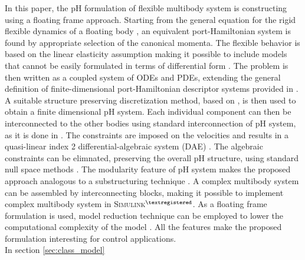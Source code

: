 \documentclass{svjour3}                     %
\begin{document}
In this paper, the pH formulation of flexible multibody system is constructing using a floating frame approach. Starting from the general equation for the rigid flexible dynamics of a floating body \cite{MB_Daepde}, an equivalent port-Hamiltonian system is found by appropriate selection of the canonical momenta. The flexible behavior is based on the linear elasticity assumption making it possible to include models that cannot be easily formulated in terms of differential form  \cite{BRUGNOLI2019940,BRUGNOLI2019961}. The problem is then written as a coupled system of ODEs and PDEs, extending the general definition of finite-dimensional port-Hamiltonian descriptor systems provided in \cite{mehrmann2019structurepreserving}. A suitable structure preserving discretization method, based on \cite{cardoso2019partitioned}, is then used to obtain a finite dimensional pH system. Each individual component can then be interconnected to the other bodies using standard interconnection of pH system, as it is done in \cite{macchelli_flrig}. The constraints are imposed on the velocities and results in a quasi-linear index 2 differential-algebraic system (DAE) \cite{phd_steinbrecher}. The algebraic constraints can be elimnated, preserving the overall pH structure, using standard null space methods \cite{nullspaceFlMult}. The modularity feature of pH system makes the proposed approach analogous to a substructuring technique \cite{substructuring}. A complex multibody system can be assembled by interconnecting blocks, making it possible to implement complex multibody system in \textsc{Simulink}$^{\tiny{\textregistered}}$. As a floating frame formulation is used, model reduction technique can be employed to lower the computational complexity of the model \cite{phode_red,phdae_red}. All the features make the proposed formulation interesting for control applications. \\
In section \ref{sec:class_model}

 
\end{document}

